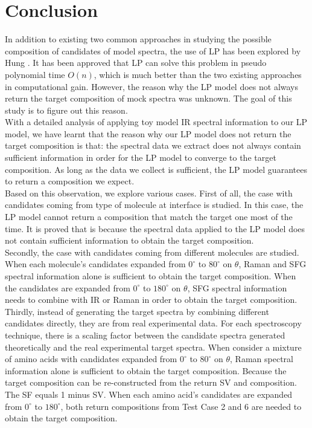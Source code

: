   \label{ch:7}

\section{Conclusion}
In addition to existing two common approaches in studying the possible composition of candidates of model spectra, the use of LP has been explored by Hung \cite{KuoKaiHung:Thesis:2015}. It has been approved that LP can solve this problem in  pseudo polynomial time $O(n)$, which is much better than the two existing approaches in computational gain. However, the reason why the LP model does not always return the target composition of mock spectra was unknown. The goal of this study is to figure out this reason. \\

With a detailed analysis of applying toy model IR spectral information to our LP model, we have learnt that the reason why our LP model does not return the target composition is that: the spectral data we extract does not always contain sufficient information in order for the LP model to converge to the target composition. As long as the data we collect is sufficient, the LP model guarantees to return a composition we expect. \\

Based on this observation, we explore various cases. First of all, the case with candidates coming from type of molecule at interface is studied. In this case, the LP model cannot return a composition that match the target one most of the time. It is proved that is because the spectral data applied to the LP model does not contain sufficient information to obtain the target composition. \\

Secondly, the case with candidates coming from different molecules are studied. When each molecule's candidates expanded from $0^{\circ}$ to $80^{\circ}$ on $\theta$, Raman and SFG spectral information alone is sufficient to obtain the target composition. When the candidates are expanded from $0^{\circ}$ to $180^{\circ}$ on $\theta$, SFG spectral information needs to combine with IR or Raman in order to obtain the target composition. \\

Thirdly, instead of generating the target spectra by combining different candidates directly, they are from real experimental data. For each spectroscopy technique, there is a scaling factor between the candidate spectra generated theoretically and the real experimental target spectra. When consider a mixture of amino acids with candidates expanded from $0^{\circ}$ to $80^{\circ}$ on $\theta$, Raman spectral information alone is sufficient to obtain the target composition. Because the target composition can be re-constructed from the return SV and composition. The SF equals 1 minus SV. When each amino acid's candidates are expanded from $0^{\circ}$ to $180^{\circ}$, both return compositions from Test Case 2 and 6 are needed to obtain the target composition. \\

